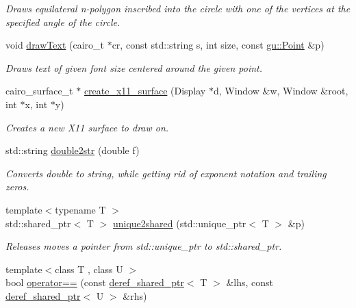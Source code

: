 \begin{DoxyCompactItemize}
\begin{DoxyCompactList}\small\item\em Draws equilateral n-\/polygon inscribed into the circle with one of the vertices at the specified angle of the circle. \end{DoxyCompactList}\item 
void \hyperlink{namespaceslb_1_1core_1_1util_a95928fbd32acc4010efe2c6fc5d7191e}{draw\+Text} (cairo\+\_\+t $\ast$cr, const std\+::string s, int size, const \hyperlink{structslb_1_1core_1_1util_1_1gu_1_1Point}{gu\+::\+Point} \&p)
\begin{DoxyCompactList}\small\item\em Draws text of given font size centered around the given point. \end{DoxyCompactList}\item 
cairo\+\_\+surface\+\_\+t $\ast$ \hyperlink{namespaceslb_1_1core_1_1util_af57d4bad2c58dd80bdfb6e8fa9fca62c}{create\+\_\+x11\+\_\+surface} (Display $\ast$d, Window \&w, Window \&root, int $\ast$x, int $\ast$y)
\begin{DoxyCompactList}\small\item\em Creates a new X11 surface to draw on. \end{DoxyCompactList}\item 
std\+::string \hyperlink{namespaceslb_1_1core_1_1util_a903619e2dfde6392a7384dbfeaa6eafc}{double2str} (double f)
\begin{DoxyCompactList}\small\item\em Converts double to string, while getting rid of exponent notation and trailing zeros. \end{DoxyCompactList}\item 
{\footnotesize template$<$typename T $>$ }\\std\+::shared\+\_\+ptr$<$ T $>$ \hyperlink{namespaceslb_1_1core_1_1util_ab3e706fd0a5bcfdbcdac11c8e6ee5f31}{unique2shared} (std\+::unique\+\_\+ptr$<$ T $>$ \&p)
\begin{DoxyCompactList}\small\item\em Releases moves a pointer from {\ttfamily std\+::unique\+\_\+ptr} to {\ttfamily std\+::shared\+\_\+ptr}. \end{DoxyCompactList}\item 
{\footnotesize template$<$class T , class U $>$ }\\bool \hyperlink{namespaceslb_1_1core_1_1util_a6524ef64141336dce5cec7062b756569}{operator==} (const \hyperlink{classslb_1_1core_1_1util_1_1deref__shared__ptr}{deref\+\_\+shared\+\_\+ptr}$<$ T $>$ \&lhs, const \hyperlink{classslb_1_1core_1_1util_1_1deref__shared__ptr}{deref\+\_\+shared\+\_\+ptr}$<$ U $>$ \&rhs)

\end{DoxyCompactItemize}
